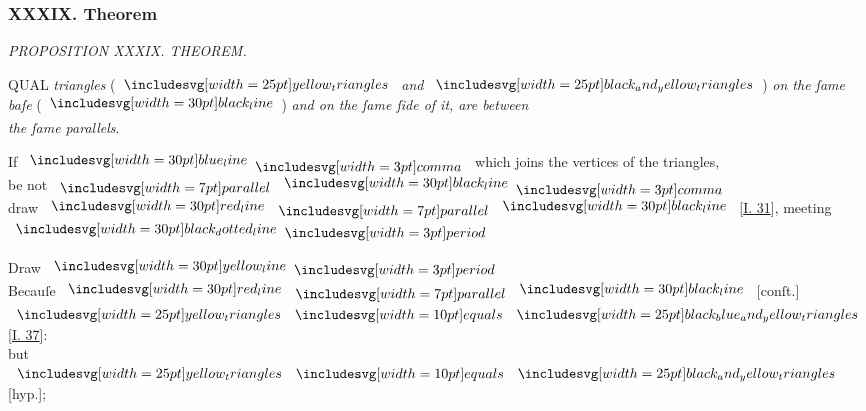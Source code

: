 \documentclass[12pt,preview]{standalone}
\begin{document}
\subsubsection{XXXIX. Theorem}

\begin{minipage}[t]{0.33\textwidth}
    \vspace{40pt}
    
\end{minipage}%
\hfill
\begin{minipage}[t]{0.64\textwidth}
    \vspace{0pt}

    \begin{center}
        \textit{PROPOSITION XXXIX. THEOREM.}\label{book1pr39} \\
    \end{center}

    \hfill

    \begin{center}
        \raggedright \lettrine[lines=4, loversize=1, nindent=0pt]{}{}QUAL \textit{triangles} (\hspace{-1ex}$\img{yellow_triangles}$ \textit{and} $\img{black_and_yellow_triangles}$\hspace{-1ex}) \textit{on the ſame\\ baſe} (\hspace{-1ex}$\blackline$\hspace{-1ex}) \textit{and on the ſame ſide of it, are between\\ the ſame parallels}.
    \end{center}

    \hfill

    \hfill

    \begin{center}
        If $\blueline \bcomma$ which joins the vertices of the triangles,\\
        be not $\bparallel \blackline \bcomma$\\
        draw $\redline \bparallel \blackline$ [\hyperref[book1pr31]{\textsc{I.} 31}], meeting $\dottedblackline \bperiod$
    \end{center}

    \hfill

    \begin{center}
        Draw $\yellowline \bperiod$\\
        Becauſe $\redline \bparallel \blackline$ [conſt.]\\
        $\img{yellow_triangles} \bequals \img{black_blue_and_yellow_triangles}$ [\hyperref[book1pr37]{\textsc{I.} 37}]:\\
        but $\img{yellow_triangles} \bequals \img{black_and_yellow_triangles}$ [hyp.];
    \end{center}


\end{minipage}
\end{document}
